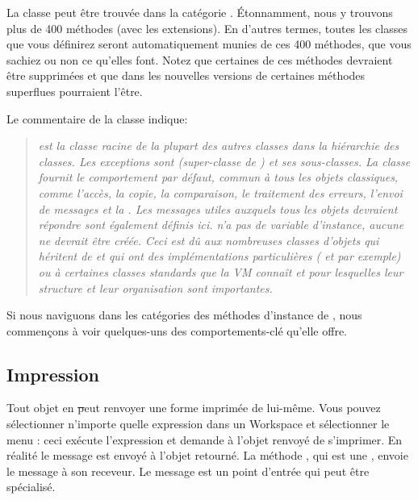 \documentclass[a4paper,10pt,twoside]{book}
\begin{document}
La classe  peut \^etre trouv\'ee dans la cat\'egorie
. \'Etonnamment, nous y trouvons plus de 400
m\'ethodes (avec les extensions). En d'autres termes, toutes les
classes que vous d\'efinirez seront automatiquement munies de ces 400
m\'ethodes, que vous sachiez ou non ce qu'elles font.
Notez que certaines de ces m\'ethodes devraient \^etre supprim\'ees et
que dans les nouvelles versions de \sq certaines m\'ethodes superflues
pourraient l'\^etre.

Le commentaire de la classe  indique:
\begin{quote}
\textit{ est la classe racine de la plupart des autres classes dans la hi\'erarchie des classes. Les exceptions sont  (super-classe de ) et ses sous-classes.
La classe  fournit le comportement par d\'efaut, commun \`a tous les objets classiques, comme l'acc\`es, la copie, la comparaison, le traitement des erreurs, l'envoi de messages et la . Les messages utiles auxquels tous les objets devraient r\'epondre sont \'egalement d\'efinis ici.
 n'a pas de variable d'instance, aucune ne devrait \^etre
cr\'e\'ee. Ceci est d\^u aux nombreuses classes d'objets qui
h\'eritent de  et qui ont des impl\'ementations
particuli\`eres ( et  par
exemple) ou \`a certaines classes standards que la VM conna\^it et
pour lesquelles leur structure et leur organisation sont importantes.}
\end{quote}

Si nous naviguons dans les cat\'egories des m\'ethodes d'instance de , nous commen\c{c}ons \`a voir quelques-uns des comportements-cl\'e qu'elle offre.

\subsection{Impression}
Tout objet en \st peut renvoyer une forme imprim\'ee de lui-m\^eme. Vous pouvez s\'electionner n'importe quelle expression dans un Workspace et s\'electionner le menu : ceci ex\'ecute l'expression et demande \`a l'objet renvoy\'e de s'imprimer. En r\'ealit\'e le message  est envoy\'e \`a l'objet retourn\'e. La m\'ethode , qui est une , envoie le message  \`a son receveur. Le message  est un point d'entr\'ee qui peut \^etre sp\'ecialis\'e. 
\end{document}
